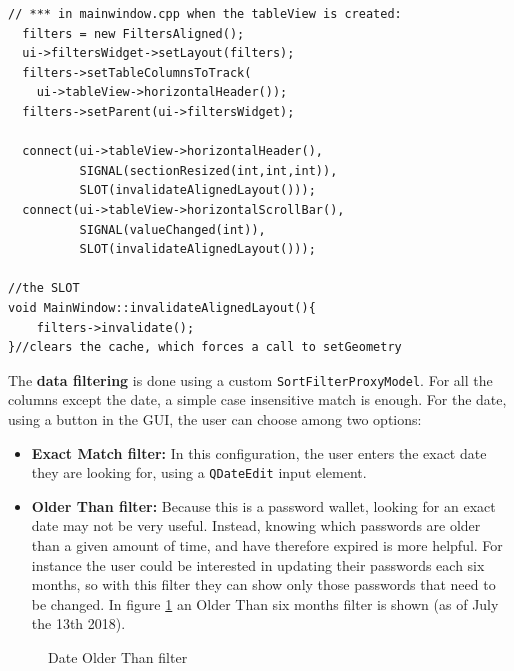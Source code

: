 \begin{lstlisting}[style=customc, float=htb, caption={Table View and aligned filters connection}, label = {lis:alignedcon}]
// *** in mainwindow.cpp when the tableView is created:
  filters = new FiltersAligned();
  ui->filtersWidget->setLayout(filters);
  filters->setTableColumnsToTrack(
    ui->tableView->horizontalHeader());
  filters->setParent(ui->filtersWidget);
  
  connect(ui->tableView->horizontalHeader(),
          SIGNAL(sectionResized(int,int,int)), 
          SLOT(invalidateAlignedLayout()));
  connect(ui->tableView->horizontalScrollBar(), 
          SIGNAL(valueChanged(int)),
          SLOT(invalidateAlignedLayout()));

//the SLOT
void MainWindow::invalidateAlignedLayout(){
    filters->invalidate(); 
}//clears the cache, which forces a call to setGeometry
\end{lstlisting}


The \textbf{data filtering} is done using a custom \texttt{SortFilterProxyModel}. For all the columns except the date, a simple case insensitive match is enough. For the date, using a button in the GUI, the user can choose among two options:

\begin{itemize}
\setlength\itemsep{-3pt}

\item \textbf{Exact Match filter: }In this configuration, the user enters the exact date they are looking for, using a \texttt{QDateEdit} input element.
\item \textbf{Older Than filter: }Because this is a password wallet, looking for an exact date may not be very useful. Instead, knowing which passwords are older than a given amount of time, and have therefore expired is more helpful. For instance the user could be interested in updating their passwords each six months, so with this filter they can show only those passwords that need to be changed. In figure \ref{fig:filterdate} an Older Than six months filter is shown (as of July the 13th 2018).
\end{itemize}

\begin{figure}[ht]
  \centering
  {}
  \caption{Date Older Than filter }
 \label{fig:filterdate}
\end{figure}

